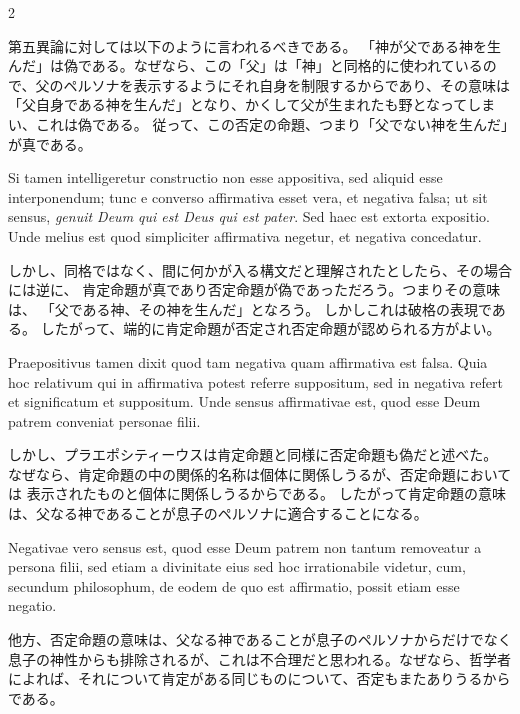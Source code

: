 \documentclass[paper=a4paper,fontsize=10pt,jafontsize=9pt,titlepage]{jlreq}
\begin{document}
\begin{paracol}{2}
\switchcolumn

第五異論に対しては以下のように言われるべきである。
「神が父である神を生んだ」は偽である。なぜなら、この「父」は「神」と同格的に使われているので、父のペルソナを表示するようにそれ自身を制限するからであり、その意味は「父自身である神を生んだ」となり、かくして父が生まれたも野となってしまい、これは偽である。
従って、この否定の命題、つまり「父でない神を生んだ」が真である。

\switchcolumn*

Si tamen intelligeretur
constructio non esse appositiva, sed aliquid esse interponendum; tunc e
converso affirmativa esset vera, et negativa falsa; ut sit sensus,
\textit{genuit Deum qui est Deus qui est pater}. Sed haec est extorta
expositio. Unde melius est quod simpliciter affirmativa negetur, et
negativa concedatur.

\switchcolumn

しかし、同格ではなく、間に何かが入る構文だと理解されたとしたら、その場合には逆に、
肯定命題が真であり否定命題が偽であっただろう。つまりその意味は、
「父である神、その神を生んだ」となろう。
しかしこれは破格の表現である。
したがって、端的に肯定命題が否定され否定命題が認められる方がよい。

\switchcolumn*

Praepositivus tamen dixit quod tam negativa quam
affirmativa est falsa. Quia hoc relativum qui in affirmativa potest
referre suppositum, sed in negativa refert et significatum et
suppositum. Unde sensus affirmativae est, quod esse Deum patrem
conveniat personae filii.

\switchcolumn

しかし、プラエポシティーウスは肯定命題と同様に否定命題も偽だと述べた。
なぜなら、肯定命題の中の関係的名称は個体に関係しうるが、否定命題においては
表示されたものと個体に関係しうるからである。
したがって肯定命題の意味は、父なる神であることが息子のペルソナに適合することになる。

\switchcolumn*

Negativae vero sensus est, quod esse Deum
patrem non tantum removeatur a persona filii, sed etiam a divinitate
eius sed hoc irrationabile videtur, cum, secundum philosophum, de eodem
de quo est affirmatio, possit etiam esse negatio.

\switchcolumn

他方、否定命題の意味は、父なる神であることが息子のペルソナからだけでなく息子の神性からも排除されるが、これは不合理だと思われる。なぜなら、哲学者によれば、それについて肯定がある同じものについて、否定もまたありうるからである。

\switchcolumn*

\end{paracol}
\newpage
\end{document}
